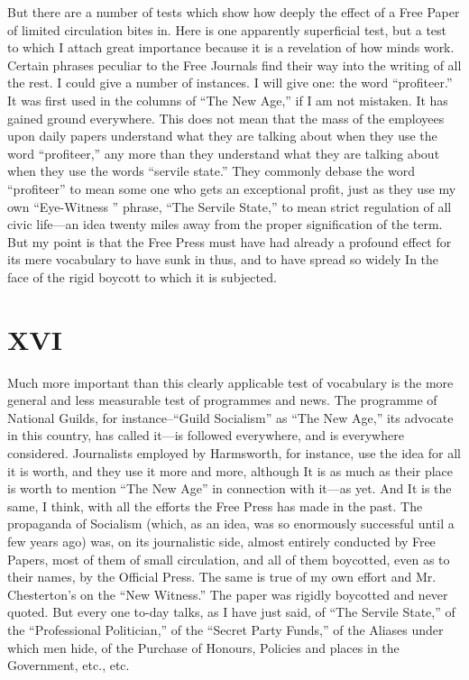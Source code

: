 \documentclass{book}
\begin{document}
But there are a number of tests which show how deeply the effect of a Free Paper of limited circulation bites in. Here is one apparently superficial test, but a test to which I attach great importance because it is a revelation of how minds work. Certain phrases peculiar to the Free Journals find their way into the writing of all the rest. I could give a number of instances. I will give one: the word “profiteer.” It was first used in the columns of “The New Age,” if I am not mistaken. It has gained ground everywhere. This does not mean that the mass of the employees upon daily papers understand what they are talking about when they use the word “profiteer,” any more than they understand what they are talking about when they use the words “servile state.” They commonly debase the word “profiteer” to mean some one who gets an exceptional profit, just as they use my own “Eye-Witness ” phrase, “The Servile State,” to mean strict regulation of all civic life—an idea twenty miles away from the proper signification of the term. But my point is that the Free Press must have had already a profound effect for its mere vocabulary to have sunk in thus, and to have spread so widely In the face of the rigid boycott to which it is subjected.

\chapter*{XVI}
\label{chapter-17}
Much more important than this clearly applicable test of vocabulary is the more general and less measurable test of programmes and news. The programme of National Guilds, for instance–“Guild Socialism” as “The New Age,” its advocate in this country, has called it—is followed everywhere, and is everywhere considered. Journalists employed by Harmsworth, for instance, use the idea for all it is worth, and they use it more and more, although It is as much as their place is worth to mention “The New Age” in connection with it—as yet. And It is the same, I think, with all the efforts the Free Press has made in the past. The propaganda of Socialism (which, as an idea, was so enormously successful until a few years ago) was, on its journalistic side, almost entirely conducted by Free Papers, most of them of small circulation, and all of them boycotted, even as to their names, by the Official Press. The same is true of my own effort and Mr. Chesterton’s on the “New Witness.” The paper was rigidly boycotted and never quoted. But every one to-day talks, as I have just said, of “The Servile State,” of the “Professional Politician,” of the “Secret Party Funds,” of the Aliases under which men hide, of the Purchase of Honours, Policies and places in the Government, etc., etc.
\end{document}
